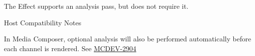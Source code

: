 \begin{Desc}
\begin{description}
\item[{\em 
\hypertarget{a00283_a6571f4e41a5dd06e4067249228e2249ea5a2bacb421fc36f890a121f01a9e72ba}{}A\+A\+X\+\_\+e\+Property\+\_\+\+Optional\+Analysis\label{a00283_a6571f4e41a5dd06e4067249228e2249ea5a2bacb421fc36f890a121f01a9e72ba}
}]The Effect supports an analysis pass, but does not require it. \begin{DoxyRefDesc}{Host Compatibility Notes}
\item[\hyperlink{a00380__compatibility_notes000065}{Host Compatibility Notes}]In Media Composer, optional analysis will also be performed automatically before each channel is rendered. See \hyperlink{a00374_MCDEV-2904}{M\+C\+D\+E\+V-\/2904}\end{DoxyRefDesc}



\end{description}
\end{Desc}
